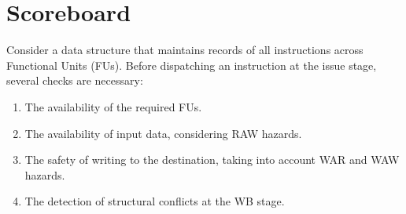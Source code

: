 \section{Scoreboard}

Consider a data structure that maintains records of all instructions across Functional Units (FUs). 
Before dispatching an instruction at the issue stage, several checks are necessary:
\begin{enumerate}
    \item The availability of the required FUs.
    \item The availability of input data, considering RAW hazards.
    \item The safety of writing to the destination, taking into account WAR and WAW hazards.
    \item The detection of structural conflicts at the WB stage.
\end{enumerate}

